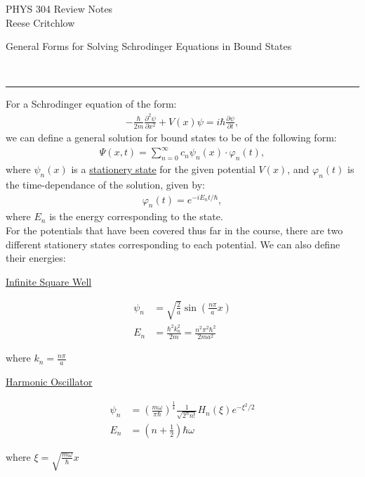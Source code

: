 \documentclass{article}
\newcommand{\header}[1]{\begin{large}\noindent #1\end{large}\\\rule{\textwidth}{0.5pt}}
\newcommand{\gap}{\medskip\\}
\newcommand{\centertext}[1]{\begin{center}#1\end{center}}
\newcommand{\ds}{\displaystyle}
\begin{document}
    \begin{center}
        \Large PHYS 304 Review Notes\\
        \normalsize Reese Critchlow
    \end{center}

    \header{General Forms for Solving Schrodinger Equations in Bound States}

    For a Schrodinger equation of the form:
    \begin{align*}
        -\frac{\hbar}{2m} \frac{\partial^2 \psi}{\partial x^2} + V(x) \psi = i\hbar \frac{\partial \psi}{\partial t},
    \end{align*}
    we can define a general solution for bound states to be of the 
    following form:
    \begin{align*}
        \Psi(x, t) = \sum_{n=0}^{\infty} c_n \psi_n(x) \cdot \varphi_n(t),
    \end{align*}
    where $\psi_n(x)$ is a \underline{stationery state} for the given potential
    $V(x)$, and $\varphi_n(t)$ is the time-dependance of the solution,
    given by:
    \begin{align*}
        \varphi_n(t) = e^{-iE_n t/\hbar},
    \end{align*}
    where $E_n$ is the energy corresponding to the state.
    \gap
    For the potentials that have been covered thus far in the course,
    there are two different stationery states corresponding to each 
    potential. We can also define their energies:

    \begin{multicols}{2}
        \centertext{\underline{Infinite Square Well}}
        \begin{align*}
            \psi_n &= \sqrt{\frac{2}{a}}\sin\left(\frac{n\pi}{a}x\right)\\
            E_n &= \frac{\hbar^2 k_n^2}{2m} = \frac{n^2 \pi^2 \hbar^2}{2ma^2}
        \end{align*}
        \centertext{where $k_n = \frac{n\pi}{a}$}
        \vfill\null
        \columnbreak
        \centertext{\underline{Harmonic Oscillator}}
        \begin{align*}
            \psi_n &= \left(\frac{m\omega}{\pi \hbar}\right)^{\frac{1}{4}} \frac{1}{\sqrt{2^n n!}}H_n(\xi)e^{-\xi^2/2}\\
            E_n &= \left(n + \frac{1}{2}\right) \hbar \omega
        \end{align*}
        \centertext{where $\ds \xi = \sqrt{\frac{m\omega}{\hbar}}x$}
        \vfill\null
    \end{multicols}
\end{document}
